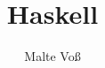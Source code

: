 \documentclass{sdqbeamer}
\title{Haskell}
\author{Malte Vo\ss}
\date{}        %
\begin{document}
\KITtitleframe


\end{document}
